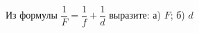 \begin{ex}
	\begin{condition}
		Из формулы \( \dfrac{1}{F}=\dfrac{1}{f}+\dfrac{1}{d} \) выразите: а) \( F \); б) \( d \)
	\end{condition}
\end{ex}